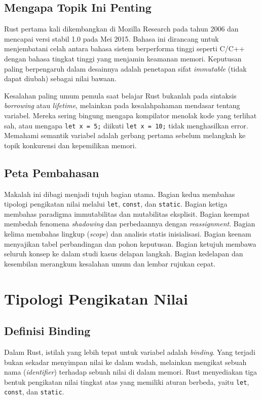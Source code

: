 \documentclass[11pt,a4paper]{article}
\begin{document}
\subsection{Mengapa Topik Ini Penting}

Rust pertama kali dikembangkan di Mozilla Research pada tahun 2006 dan mencapai versi stabil 1.0 pada Mei 2015. Bahasa ini dirancang untuk menjembatani celah antara bahasa sistem berperforma tinggi seperti C/C++ dengan bahasa tingkat tinggi yang menjamin keamanan memori. Keputusan paling berpengaruh dalam desainnya adalah penetapan sifat \textit{immutable} (tidak dapat diubah) sebagai nilai bawaan.

Kesalahan paling umum pemula saat belajar Rust bukanlah pada sintaksis \textit{borrowing} atau \textit{lifetime}, melainkan pada kesalahpahaman mendasar tentang variabel. Mereka sering bingung mengapa kompilator menolak kode yang terlihat sah, atau mengapa \texttt{let x = 5;} diikuti \texttt{let x = 10;} tidak menghasilkan error. Memahami semantik variabel adalah gerbang pertama sebelum melangkah ke topik konkurensi dan kepemilikan memori.

\subsection{Peta Pembahasan}

Makalah ini dibagi menjadi tujuh bagian utama. Bagian kedua membahas tipologi pengikatan nilai melalui \texttt{let}, \texttt{const}, dan \texttt{static}. Bagian ketiga membahas paradigma immutabilitas dan mutabilitas eksplisit. Bagian keempat membedah fenomena \textit{shadowing} dan perbedaannya dengan \textit{reassignment}. Bagian kelima membahas lingkup (\textit{scope}) dan analisis statis inisialisasi. Bagian keenam menyajikan tabel perbandingan dan pohon keputusan. Bagian ketujuh membawa seluruh konsep ke dalam studi kasus delapan langkah. Bagian kedelapan dan kesembilan merangkum kesalahan umum dan lembar rujukan cepat.

\section{Tipologi Pengikatan Nilai}

\subsection{Definisi Binding}

Dalam Rust, istilah yang lebih tepat untuk variabel adalah \textit{binding}. Yang terjadi bukan sekadar menyimpan nilai ke dalam wadah, melainkan mengikat sebuah nama (\textit{identifier}) terhadap sebuah nilai di dalam memori. Rust menyediakan tiga bentuk pengikatan nilai tingkat atas yang memiliki aturan berbeda, yaitu \texttt{let}, \texttt{const}, dan \texttt{static}.
\end{document}

